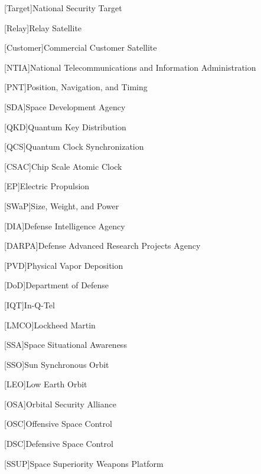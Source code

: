 




[Target]{National Security Target}

[Relay]{Relay Satellite}

[Customer]{Commercial Customer Satellite}

[NTIA]{National Telecommunications and Information
  Administration}

[PNT]{Position, Navigation, and Timing}

[SDA]{Space Development Agency}

[QKD]{Quantum Key Distribution}

[QCS]{Quantum Clock Synchronization}

[CSAC]{Chip Scale Atomic Clock}

[EP]{Electric Propulsion}

[SWaP]{Size, Weight, and Power}

[DIA]{Defense Intelligence Agency}

[DARPA]{Defense Advanced Research Projects Agency}

[PVD]{Physical Vapor Deposition}

[DoD]{Department of Defense}

[IQT]{In-Q-Tel}

[LMCO]{Lockheed Martin}

[SSA]{Space Situational Awareness}

[SSO]{Sun Synchronous Orbit}

[LEO]{Low Earth Orbit}

[OSA]{Orbital Security Alliance}

[OSC]{Offensive Space Control}

[DSC]{Defensive Space Control}

[SSUP]{Space Superiority Weapons Platform}

